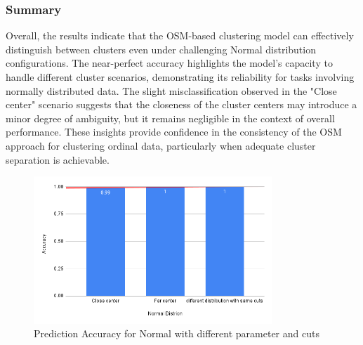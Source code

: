 \documentclass{article}
\begin{document}
\subsubsection*{Summary}

Overall, the results indicate that the OSM-based clustering model can effectively distinguish between clusters even under challenging Normal distribution configurations. 
The near-perfect accuracy highlights the model's capacity to handle different cluster scenarios, demonstrating its reliability for tasks involving normally distributed data. 
The slight misclassification observed in the "Close center" scenario suggests that the closeness of the cluster centers may introduce a minor degree of ambiguity, but it remains negligible in the context of overall performance. 
These insights provide confidence in the consistency of the OSM approach for clustering ordinal data, particularly when adequate cluster separation is achievable.

\begin{figure}[htbp!]
  \centering
  \includegraphics[width=0.8\textwidth]{images/experiments/norm_dist.png}
  \caption{Prediction Accuracy for Normal with different parameter and cuts}
  \label{fig:dist_acc}
\end{figure}
\end{document}
